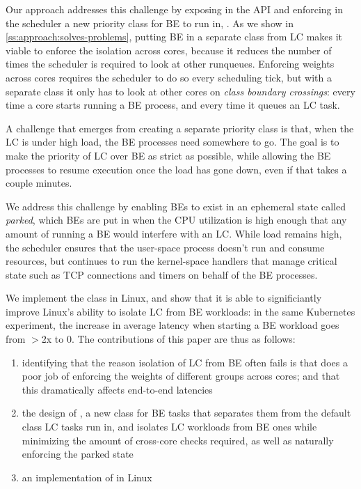 Our approach addresses this challenge by exposing in the API and enforcing in
the scheduler a new priority class for BE to run in, \beclass{}. As we show in
\autoref{ss:approach:solves-problems}, putting BE in a separate class from LC
makes it viable to enforce the isolation across cores, because it reduces the
number of times the scheduler is required to look at other runqueues. Enforcing
weights across cores requires the scheduler to do so every scheduling tick, but
with a separate class it only has to look at other cores on \textit{class
boundary crossings}: every time a core starts running a BE process, and every
time it queues an LC task.

A challenge that emerges from creating a separate priority class is that, when
the LC is under high load, the BE processes need somewhere to go. The goal is to
make the priority of LC over BE as strict as possible, while allowing the BE
processes to resume execution once the load has gone down, even if that takes a
couple minutes.

We address this challenge by enabling BEs to exist in an ephemeral state called
\textit{parked}, which BEs are put in when the CPU utilization is high enough
that any amount of running a BE would interfere with an LC. While load remains
high, the scheduler ensures that the user-space process doesn't run and consume
resources, but continues to run the kernel-space handlers that manage critical
state such as TCP connections and timers on behalf of the BE processes. 

We implement the \beclass{} class in Linux, and show that it is able to
significiantly improve Linux's ability to isolate LC from BE workloads: in the
same Kubernetes experiment, the increase in average latency when starting a BE
workload goes from $>$2x to 0. The contributions of this paper are thus as
follows: 
\begin{enumerate}
    \item identifying that the reason isolation of LC from BE often fails is that
    \cgroups{} does a poor job of enforcing the weights of different groups
    across cores; and that this dramatically affects end-to-end latencies
    \item the design of \beclass{}, a new class for BE tasks that separates
    them from the default class LC tasks run in, and isolates LC workloads from
    BE ones while minimizing the amount of cross-core checks required, as well as
    naturally enforcing the parked state
    \item an implementation of \beclass{} in Linux
\end{enumerate}
